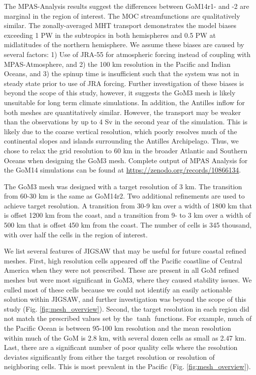 The MPAS-Analysis results suggest the differences between GoM14r1- and -2 are marginal in the region of interest. The MOC streamfunctions are qualitatively similar. The zonally-averaged MHT transport demonstrates the model biases exceeding 1 PW in the subtropics in both hemispheres and 0.5 PW at midlatitudes of the northern hemisphere. We assume these biases are caused by several factors: 1) Use of JRA-55 for atmospheric forcing instead of coupling with MPAS-Atmosphere, and 2) the 100 km resolution in the Pacific and Indian Oceans, and 3) the spinup time is insufficient such that the system was not in steady state prior to use of JRA forcing. Further investigation of these biases is beyond the scope of this study, however, it suggests the GoM3 mesh is likely unsuitable for long term climate simulations. In addition, the Antilles inflow for both meshes are quantitatively similar. However, the transport may be weaker than the observations by up to 4 Sv in the second year of the simulation. This is likely due to the coarse vertical resolution, which poorly resolves much of the continental slopes and islands surrounding the Antilles Archipelago. Thus, we chose to relax the grid resolution to 60 km in the broader Atlantic and Southern Oceans when designing the GoM3 mesh. Complete output of MPAS Analysis for the GoM14 simulations can be found at \url{https://zenodo.org/records/10866134}. 

The GoM3 mesh was designed with a target resolution of 3 km. The transition from 60-30 km is the same as GoM14r2. Two additional refinements are used to achieve target resolution. A transition from 30-9 km over a width of 1800 km that is offset 1200 km from the coast, and a transition from 9- to 3 km over a width of 500 km that is offset 450 km from the coast. The number of cells is 345 thousand, with over half the cells in the region of interest. %

We list several features of JIGSAW that may be useful for future coastal refined meshes. First, high resolution cells appeared off the Pacific coastline of Central America when they were not prescribed. These are present in all GoM refined meshes but were most significant in GoM3, where they caused stability issues. We culled most of these cells because we could not identify an easily actionable solution within JIGSAW, and further investigation was beyond the scope of this study (Fig. \ref{fig:mesh_overview}). Second, the target resolution in each region did not match the prescribed values set by the $\tanh$ functions. For example, much of the Pacific Ocean is between 95-100 km resolution and the mean resolution within much of the GoM is 2.8 km, with several dozen cells as small as 2.47 km. Last, there are a significant number of poor quality cells where the resolution deviates significantly from either the target resolution or resolution of neighboring cells. This is most prevalent in the Pacific (Fig. \ref{fig:mesh_overview}).

